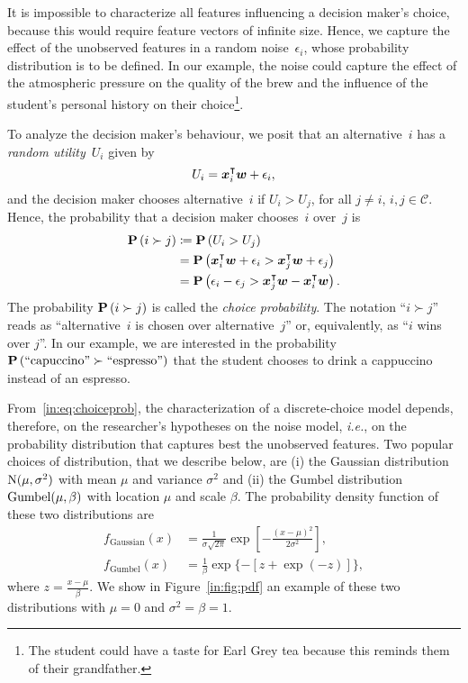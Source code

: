 It is impossible to characterize all features influencing a decision maker's choice, because this would require feature vectors of infinite size.
Hence, we capture the effect of the unobserved features in a random noise~$\epsilon_i$, whose probability distribution is to be defined.
In our example, the noise could capture the effect of the atmospheric pressure on the quality of the brew and the influence of the student's personal history on their choice\footnote{The student could have a taste for Earl Grey tea because this reminds them of their grandfather.}.

To analyze the decision maker's behaviour, we posit that an alternative~$i$ has a \emph{random utility}~$U_i$ given by
\begin{equation*}
	U_i = \bm{x}_i^\intercal \bm{w} + \epsilon_i,
\end{equation*}
and the decision maker chooses alternative~$i$ if $U_i > U_j$, for all $j \neq i$, $i,j \in \mathcal{C}$.
Hence, the probability that a decision maker chooses~$i$ over~$j$ is
\begin{align}
	\label{in:eq:choiceprob}
	\mathbf{P}\left( i \succ j \right) & \coloneqq \mathbf{P}\left( U_i > U_j \right)                                                  \nonumber \\
	                 & = \mathbf{P}\left( \bm{x}_i^\intercal \bm{w} + \epsilon_i > \bm{x}_j^\intercal \bm{w} + \epsilon_j \right) \nonumber  \\
	                 & = \mathbf{P}\left( \epsilon_i - \epsilon_j > \bm{x}_j^\intercal \bm{w} - \bm{x}_i^\intercal \bm{w} \right).
\end{align}
The probability $\mathbf{P}\left( i \succ j \right)$ is called the \emph{choice probability}.
The notation ``$i \succ j$'' reads as ``alternative~$i$ is chosen over alternative~$j$'' or, equivalently, as ``$i$ wins over $j$''.
In our example, we are interested in the probability $\mathbf{P}\left( \text{``capuccino''} \succ \text{``espresso''} \right)$ that the student chooses to drink a cappuccino instead of an espresso.

From~\eqref{in:eq:choiceprob}, the characterization of a discrete-choice model depends, therefore, on the researcher's hypotheses on the noise model, \textit{i.e.}, on the probability distribution that captures best the unobserved features.
Two popular choices of distribution, that we describe below, are (i) the Gaussian distribution $\mathrm{N}( \mu, \sigma^2 )$ with mean $\mu$ and variance $\sigma^2$ and (ii) the Gumbel distribution $\mathrm{Gumbel}( \mu, \beta )$ with location $\mu$ and scale $\beta$.
The probability density function of these two distributions are
\begin{align*}
	f_{\text{Gaussian}}(x) & = \frac{1}{\sigma \sqrt{2 \pi}} \exp \left[ -\frac{(x - \mu)^2}{2 \sigma^2} \right], \\
	f_{\text{Gumbel}}(x)   & = \frac{1}{\beta} \exp \{ - [z + \exp(-z)]\},
\end{align*}
where  $z = \frac{x - \mu}{\beta}$.
We show in Figure~\ref{in:fig:pdf} an example of these two distributions with $\mu = 0$ and $\sigma^2 = \beta = 1$.

